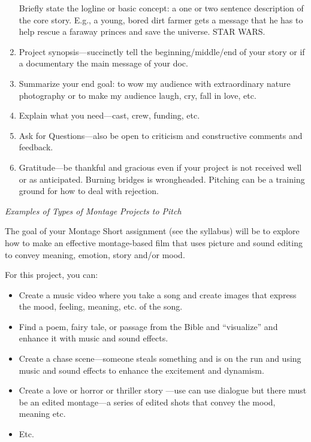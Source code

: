 \documentclass[
  letterpaper,
  DIV=11,
  numbers=noendperiod]{scrreprt}
\providecommand{\tightlist}{%
  \setlength{\itemsep}{0pt}\setlength{\parskip}{0pt}}\usepackage{longtable,booktabs,array}
\begin{document}
\begin{tcolorbox}
\begin{enumerate}
  Briefly state the logline or basic concept: a one or two sentence
  description of the core story. E.g., a young, bored dirt farmer gets a
  message that he has to help rescue a faraway princes and save the
  universe. STAR WARS.
\item
  Project synopsis---succinctly tell the beginning/middle/end of your
  story or if a documentary the main message of your doc.
\item
  Summarize your end goal: to wow my audience with extraordinary nature
  photography or to make my audience laugh, cry, fall in love, etc.
\item
  Explain what you need---cast, crew, funding, etc.
\item
  Ask for Questions---also be open to criticism and constructive
  comments and feedback.
\item
  Gratitude---be thankful and gracious even if your project is not
  received well or as anticipated. Burning bridges is wrongheaded.
  Pitching can be a training ground for how to deal with rejection.
\end{enumerate}

\emph{Examples of Types of Montage Projects to Pitch}

The goal of your Montage Short assignment (see the syllabus) will be to
explore how to make an effective montage-based film that uses picture
and sound editing to convey meaning, emotion, story and/or mood.

For this project, you can:

\begin{itemize}
\tightlist
\item
  Create a music video where you take a song and create images that
  express the mood, feeling, meaning, etc. of the song.
\item
  Find a poem, fairy tale, or passage from the Bible and ``visualize''
  and enhance it with music and sound effects.
\item
  Create a chase scene---someone steals something and is on the run and
  using music and sound effects to enhance the excitement and dynamism.
\item
  Create a love or horror or thriller story ---use can use dialogue but
  there must be an edited montage---a series of edited shots that convey
  the mood, meaning etc.
\item
  Etc.
\end{itemize}

\end{tcolorbox}
\end{document}
